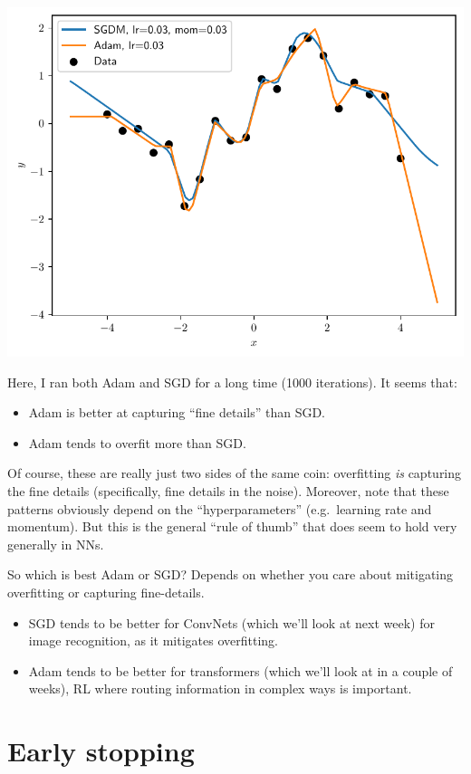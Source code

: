 \documentclass{article}
\newcommand{\0}{\mathbf{0}}
\begin{document}
\includegraphics[width=\textwidth]{adam_vs_sgd.pdf}

Here, I ran both Adam and SGD for a long time (1000 iterations).
It seems that:
\begin{itemize}
  \item Adam is better at capturing ``fine details'' than SGD.
  \item Adam tends to overfit more than SGD.
\end{itemize}
Of course, these are really just two sides of the same coin: overfitting \textit{is} capturing the fine details (specifically, fine details in the noise).
Moreover, note that these patterns obviously depend on the ``hyperparameters'' (e.g.\ learning rate and momentum).  
But this is the general ``rule of thumb'' that does seem to hold very generally in NNs.

So which is best Adam or SGD?  Depends on whether you care about mitigating overfitting or capturing fine-details.
\begin{itemize}
  \item SGD tends to be better for ConvNets (which we'll look at next week) for image recognition, as it mitigates overfitting.
  \item Adam tends to be better for transformers (which we'll look at in a couple of weeks), RL where routing information in complex ways is important.
\end{itemize}

\newpage
\section{Early stopping}
\end{document}
